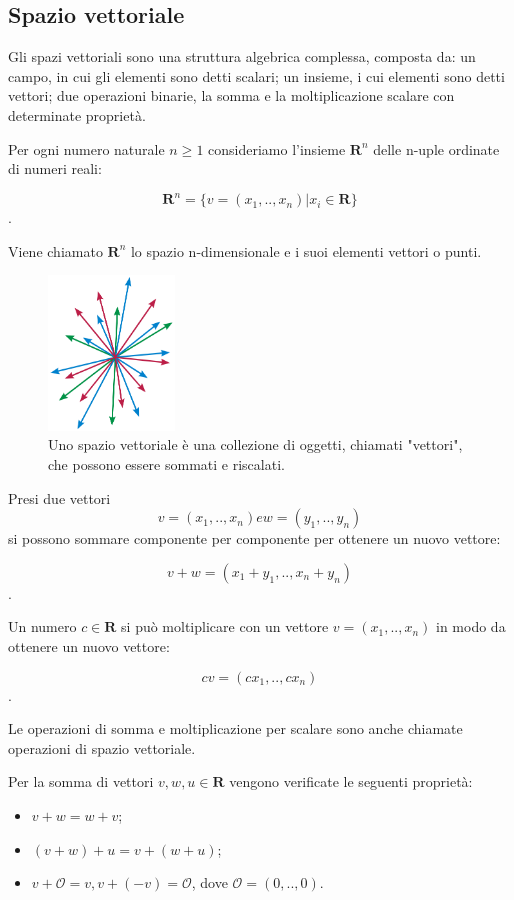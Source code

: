 \subsection{Spazio vettoriale}\label{subsec:spazi_vettoriali}
Gli spazi vettoriali sono una struttura algebrica complessa, composta da: un campo, in cui gli elementi sono detti scalari; un insieme, i cui elementi sono detti vettori; due operazioni binarie, la somma e la moltiplicazione scalare con determinate proprietà. 

Per ogni numero naturale $n \ge 1$ consideriamo l'insieme $\mathbf{R}^n$ delle n-uple ordinate di numeri reali: 

	$$\mathbf{R}^n = \{v = (x_1, .., x_n)| x_i \in \mathbf{R}\}$$.

Viene chiamato $\mathbf{R}^n$ lo spazio n-dimensionale e i suoi elementi vettori o punti. 
\begin{figure}
	\centering
	\includegraphics[width=0.3\textwidth]{Immagini/SpazioVettoriale.png}
	\caption{Uno spazio vettoriale è una collezione di oggetti, chiamati "vettori", che possono essere sommati e riscalati.}
	\label{fig:vettori}
\end{figure}
Presi due vettori $$v = (x_1, .., x_n) e w = (y_1, .., y_n)$$ si possono sommare componente per componente per ottenere un nuovo vettore: 

	$$v + w = (x_1 + y_1, .., x_n + y_n)$$.

Un numero $c \in \mathbf{R}$ si può moltiplicare con un vettore $v = (x_1, .., x_n)$ in modo da ottenere un nuovo vettore:

	$$cv = (cx_1, .., cx_n)$$.

Le operazioni di somma e moltiplicazione per scalare sono anche chiamate operazioni di spazio vettoriale. 

Per la somma di vettori $v, w, u \in \mathbf{R}$ vengono verificate le seguenti proprietà:
\vspace{10pt}
\begin{itemize}
	\item $v + w = w + v$;
	\vspace{5pt}
	\item $(v + w) + u = v + (w + u)$;
	\vspace{5pt}
	\item $v + \mathcal{O} = v, v + (-v) = \mathcal{O}$, dove $\mathcal{O} = (0, .., 0)$.
\end{itemize}

